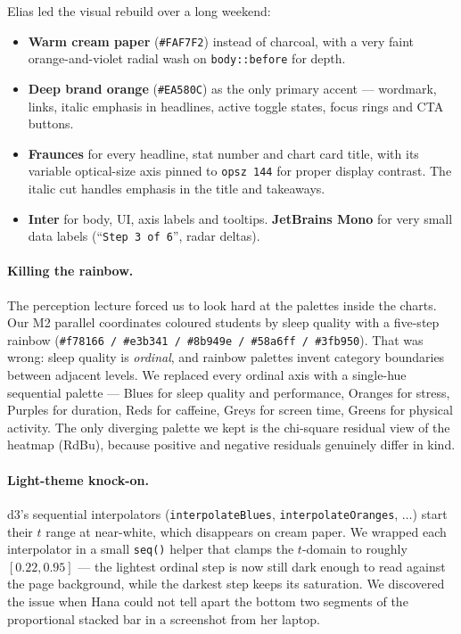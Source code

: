 \documentclass[11pt,a4paper]{article}
\newcommand{\code}[1]{\texttt{\small #1}}
\begin{document}
Elias led the visual rebuild over a long weekend:

\begin{itemize}
  \item \textbf{Warm cream paper} (\code{\#FAF7F2}) instead of charcoal, with a very faint orange-and-violet radial wash on \code{body::before} for depth.
  \item \textbf{Deep brand orange} (\code{\#EA580C}) as the only primary accent — wordmark, links, italic emphasis in headlines, active toggle states, focus rings and CTA buttons.
  \item \textbf{Fraunces} for every headline, stat number and chart card title, with its variable optical-size axis pinned to \code{opsz 144} for proper display contrast. The italic cut handles emphasis in the title and takeaways.
  \item \textbf{Inter} for body, UI, axis labels and tooltips. \textbf{JetBrains Mono} for very small data labels (``\code{Step 3 of 6}'', radar deltas).
\end{itemize}

\paragraph{Killing the rainbow.} The perception lecture forced us to look hard at the palettes inside the charts. Our M2 parallel coordinates coloured students by sleep quality with a five-step rainbow (\code{\#f78166 / \#e3b341 / \#8b949e / \#58a6ff / \#3fb950}). That was wrong: sleep quality is \emph{ordinal}, and rainbow palettes invent category boundaries between adjacent levels. We replaced every ordinal axis with a single-hue sequential palette — Blues for sleep quality and performance, Oranges for stress, Purples for duration, Reds for caffeine, Greys for screen time, Greens for physical activity. The only diverging palette we kept is the chi-square residual view of the heatmap (RdBu), because positive and negative residuals genuinely differ in kind.

\paragraph{Light-theme knock-on.} d3's sequential interpolators (\code{interpolateBlues}, \code{interpolateOranges}, $\ldots$) start their $t$ range at near-white, which disappears on cream paper. We wrapped each interpolator in a small \code{seq()} helper that clamps the $t$-domain to roughly $[0.22, 0.95]$ — the lightest ordinal step is now still dark enough to read against the page background, while the darkest step keeps its saturation. We discovered the issue when Hana could not tell apart the bottom two segments of the proportional stacked bar in a screenshot from her laptop.
\end{document}
